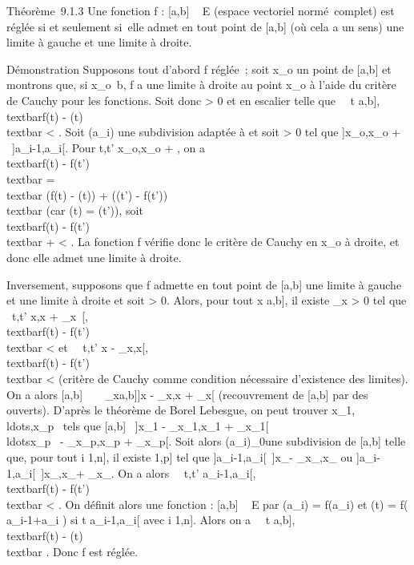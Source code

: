 \documentclass[]{article}
\begin{document}
Théorème~9.1.3 Une fonction f : {[}a,b{]} \rightarrow~ E (espace vectoriel
normé~complet) est réglée si et seulement si~elle admet en tout point de
{[}a,b{]} (où cela a un sens) une limite à gauche et une limite à
droite.

Démonstration Supposons tout d'abord f réglée~; soit x\_o un
point de {[}a,b{]} et montrons que, si
x\_o\neq~b, f a une limite à droite au
point x\_o à l'aide du critère de Cauchy pour les fonctions.
Soit donc \epsilon \textgreater{} 0 et \phi en escalier telle que
\forall~~t \in {[}a,b{]}, \\textbar{}f(t)
- \phi(t)\\textbar{} \textless{} \epsilon {} . Soit (a\_i) une subdivision adaptée à \phi et soit \eta
\textgreater{} 0 tel que {]}x\_o,x\_o +
\eta{[}\subset~{]}a\_i-1,a\_i{[}. Pour t,t'
\in{]}x\_o,x\_o + \eta{[}, on a
\\textbar{}f(t) - f(t')\\textbar{}
=\\textbar{} (f(t) - \phi(t)) + (\phi(t') -
f(t'))\\textbar{} (car \phi(t) = \phi(t')), soit
\\textbar{}f(t) - f(t')\\textbar{} \leq \epsilon
{} + \epsilon {} \textless{} \epsilon.
La fonction f vérifie donc le critère de Cauchy en x\_o à
droite, et donc elle admet une limite à droite.

Inversement, supposons que f admette en tout point de {[}a,b{]} une
limite à gauche et une limite à droite et soit \epsilon \textgreater{} 0.
Alors, pour tout x \in {[}a,b{]}, il existe \eta\_x \textgreater{} 0
tel que \forall~t,t' \in{]}x,x + \eta\_x~{[},
\\textbar{}f(t) - f(t')\\textbar{}
\textless{} \epsilon et \forall~~t,t' \in{]}x -
\eta\_x,x{[}, \\textbar{}f(t) -
f(t')\\textbar{} \textless{} \epsilon (critère de Cauchy comme
condition nécessaire d'existence des limites). On a alors {[}a,b{]}
\subset~\⋃ ~
\_x\in{[}a,b{]}{]}x - \eta\_x,x + \eta\_x{[} (recouvrement
de {[}a,b{]} par des ouverts). D'après le théorème de Borel Lebesgue, on
peut trouver
x\_1,\\ldots,x\_p~
tels que {[}a,b{]} \subset~{]}x\_1 -
\eta\_x\_1,x\_1 +
\eta\_x\_1{[}\cup\\ldots\cup{]}x\_p~
- \eta\_x\_p,x\_p + \eta\_x\_p{[}.
Soit alors (a\_i)\_0\leqi\leqn une subdivision de {[}a,b{]}
telle que, pour tout i \in {[}1,n{]}, il existe \jmath \in {[}1,p{]} tel que
{]}a\_i-1,a\_i{[}\subset~{]}x\_\jmath -
\eta\_x\_\jmath,x\_\jmath{[} ou
{]}a\_i-1,a\_i{[}\subset~{]}x\_\jmath,x\_\jmath +
\eta\_x\_\jmath{[}. On a alors \forall~~t,t'
\in{]}a\_i-1,a\_i{[}, \\textbar{}f(t) -
f(t')\\textbar{} \textless{} \epsilon. On définit alors une
fonction \phi : {[}a,b{]} \rightarrow~ E par \phi(a\_i) = f(a\_i) et \phi(t)
= f( a\_i-1+a\_i  ) si t
\in{]}a\_i-1,a\_i{[} avec i \in {[}1,n{]}. Alors on a
\forall~~t \in {[}a,b{]}, \\textbar{}f(t)
- \phi(t)\\textbar{} \leq \epsilon. Donc f est réglée.
\end{document}
